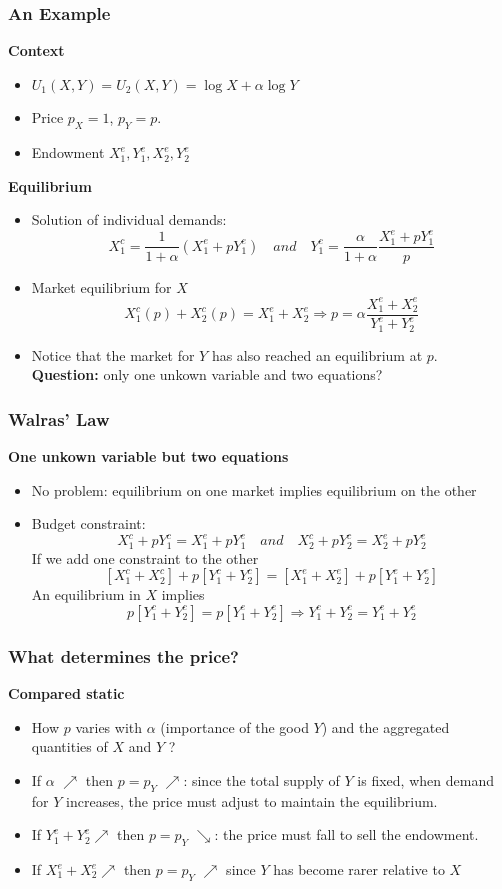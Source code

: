 \documentclass[handout]{beamer}
\newenvironment{iPar}[1]{\textbf{#1} \begin{itemize}}{\end{itemize}}
\newcommand{\mdp}{\medskip \pause}
\begin{document}
\begin{frame}\frametitle{An Example} \begin{iPar}{Context}\item $U_1(X,Y) =
U_2(X,Y) = \log X + \alpha \log Y$ \item Price $p_X= 1$, $p_Y = p$.
\item Endowment $X_1^e, Y_1^e, X_2^e, Y_2^e$ \end{iPar} \mdp
\begin{iPar}{Equilibrium} \item Solution of individual demands: $$X_1^c =
\frac{1}{1+\alpha}(X_1^e + p Y_1^e) \quad and \quad Y_1^c =
\frac{\alpha}{1+\alpha}\frac{X_1^e + p Y_1^e}{p} $$ \item Market equilibrium for $X$  \begin{equation*} X_1^c(p) + X_2^c(p) = X_1^e + X_2^e
\Rightarrow p = \alpha \frac{X_1^e + X_2^e}{Y_1^e + Y_2^e}
 \end{equation*} \item Notice that the market for $Y$ has also reached an equilibrium at $p$.\\\pause \textbf{Question:} only one unkown variable and two equations?\end{iPar} \end{frame}

\begin{frame} \frametitle{Walras' Law}

\begin{iPar}{One unkown variable but two equations} \item No problem: equilibrium on one market implies equilibrium on the other \item Budget constraint: $$ X_1^c + p Y_1^c  =   X_1^e + p Y_1^e \quad and \quad
X_2^c + p Y_2^c  =   X_2^e + p Y_2^e$$ \pause If we add one constraint to the other $$ [X_1^c + X_2^c] + p [Y_1^c + Y_2^c] = [X_1^e + X_2^e] + p
[Y_1^e + Y_2^e]$$ \pause An equilibrium in $X$  implies $$ p
[Y_1^c + Y_2^c]  = p [Y_1^e + Y_2^e] \Rightarrow  Y_1^c + Y_2^c = Y_1^e +
Y_2^e$$ \end{iPar}

\end{frame}

\begin{frame}\frametitle{What determines the price?}

\begin{iPar}{Compared static} \item How $p$ varies with $\alpha$
(importance of the good $Y$) and the aggregated quantities of $X$ and $Y$ ?
\pause \item If $\alpha$ $\nearrow$ then $p=p_Y$ $\nearrow$: since the total supply of $Y$ is fixed, when demand for $Y$ increases, the price must adjust to maintain the equilibrium. \pause \item If $Y_1^e + Y_2^e
\nearrow$ then $p=p_Y$ $\searrow$: the price must fall to sell the endowment. 
\pause \item If $X_1^e + X_2^e \nearrow$ then $p = p_Y$ $\nearrow$ since $Y$ has become rarer relative to $X$\end{iPar}

\end{frame}
\end{document}
